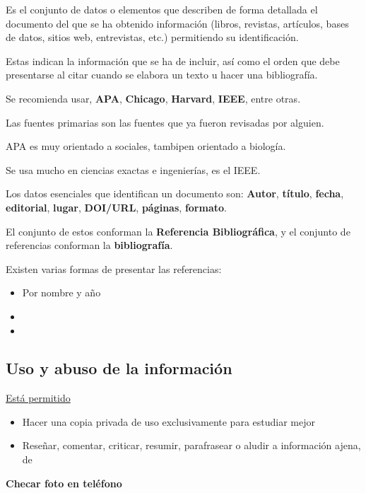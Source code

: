 \documentclass{article}
\begin{document}
Es el conjunto de datos o elementos que describen de forma detallada el documento del que se ha obtenido información (libros, revistas, artículos, bases de datos, sitios web, entrevistas, etc.) permitiendo su identificación.

Estas indican la información que se ha de incluir, así como el orden que debe presentarse al citar cuando se elabora un texto u hacer una bibliografía.

Se recomienda usar, \textbf{APA}, \textbf{Chicago}, \textbf{Harvard}, \textbf{IEEE}, entre otras.

Las fuentes primarias son las fuentes que ya fueron revisadas por alguien.

APA es muy orientado a sociales, tambipen orientado a biología.

Se usa mucho en ciencias exactas e ingenierías, es el IEEE.


Los datos esenciales que identifican un documento son: \textbf{Autor}, \textbf{título}, \textbf{fecha}, \textbf{editorial}, \textbf{lugar}, \textbf{DOI/URL}, \textbf{páginas}, \textbf{formato}.

El conjunto de estos conforman la \textbf{Referencia Bibliográfica}, y el conjunto de referencias conforman la \textbf{bibliografía}.

Existen varias formas de presentar las referencias:

\begin{itemize}
\item[$\bullet$] Por nombre y año
\item[$\bullet$] 
\item[$\bullet$]
\end{itemize}

\subsection{Uso y abuso de la información}

\underline{Está permitido}

\begin{itemize}
\item[$\bullet$] Hacer una copia privada de uso exclusivamente para estudiar mejor\\
\item[$\bullet$] Reseñar, comentar, criticar, resumir, parafrasear o aludir a información ajena, de 
\end{itemize}
 
 \textbf{Checar foto en teléfono}
 
 
\end{document}
